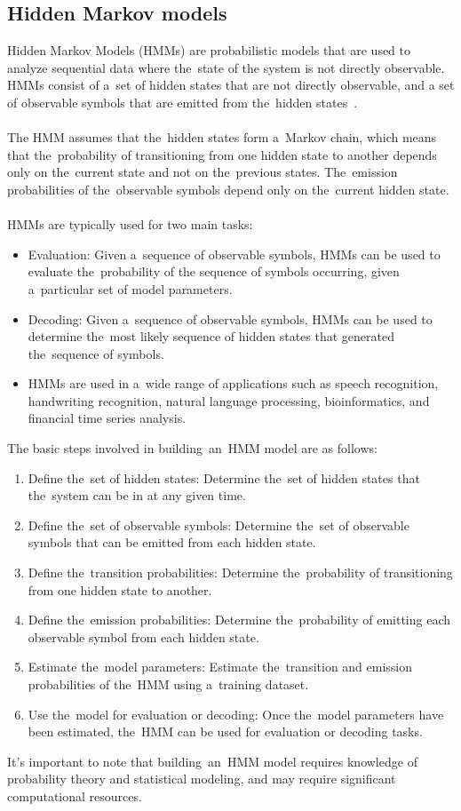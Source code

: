\subsection{Hidden Markov models}\label{subsec:hmm}
Hidden Markov Models (HMMs) are probabilistic models that are used to analyze sequential data where the~state of the
system is not directly observable. HMMs consist of a~set of hidden states that are not directly observable, and a
set of observable symbols that are emitted from the~hidden states~\cite{math10081230}.\\
\\
The HMM assumes that the~hidden states form a~Markov chain, which means that the~probability of transitioning from
one hidden state to another depends only on the~current state and not on the~previous states. The~emission
probabilities of the~observable symbols depend only on the~current hidden state.\\
\\
HMMs are typically used for two main tasks:
\begin{itemize}
    \item Evaluation: Given a~sequence of observable symbols, HMMs can be used to evaluate the~probability of the
    sequence of symbols occurring, given a~particular set of model parameters.
    \item Decoding: Given a~sequence of observable symbols, HMMs can be used to determine the~most likely
    sequence of hidden states that generated the~sequence of symbols.
    \item HMMs are used in a~wide range of applications such as speech recognition, handwriting recognition, natural
    language processing, bioinformatics, and financial time series analysis.
\end{itemize}
The basic steps involved in building~an~HMM model are as follows:
\begin{enumerate}
    \item Define the~set of hidden states: Determine the~set of hidden states that the~system can be in at any given time.
    \item Define the~set of observable symbols: Determine the~set of observable symbols that can be emitted from each hidden state.
    \item Define the~transition probabilities: Determine the~probability of transitioning from one hidden state to another.
    \item Define the~emission probabilities: Determine the~probability of emitting each observable symbol from each hidden state.
    \item Estimate the~model parameters: Estimate the~transition and emission probabilities of the~HMM using a~training dataset.
    \item Use the~model for evaluation or decoding: Once the~model parameters have been estimated, the~HMM
    can be used for evaluation or decoding tasks.
\end{enumerate}
It's important to note that building~an~HMM model requires knowledge of probability theory and statistical
modeling, and may require significant computational resources.



